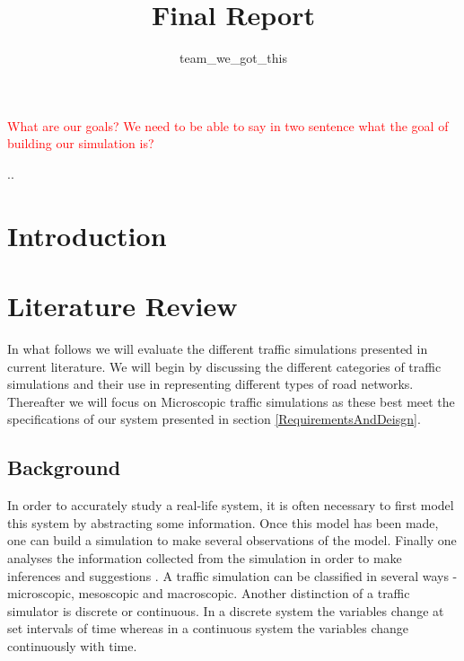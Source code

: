 \documentclass{article}
\begin{document}
\title{Final Report}
\author{team\_we\_got\_this}
\maketitle
\thispagestyle{plain}
\graphicspath{ {Images/} }

\tableofcontents
\listoffigures
\listoftables
\vspace{2cm}
\textcolor{red}{What are our goals? We need to be able to say in two sentence what the goal of building our simulation is? }

\pagebreak
..\section*{Introduction}

\section{Literature Review}
	
	\noindent
	In what follows we will evaluate the different traffic simulations presented in current literature. We will begin by discussing the different categories of traffic simulations and their use in representing different types of road networks. Thereafter we will focus on Microscopic traffic simulations as these best meet the specifications of our system presented in section \ref{RequirementsAndDeisgn}.
	
	\subsection{Background}
	
	In order to accurately study a real-life system, it is often necessary to first model this system by abstracting some information. Once this model has been made, one can build a simulation to make several observations of the model. Finally one analyses the information collected from the simulation in order to make inferences and suggestions \cite{sokolowski2011principles}. A traffic simulation can be classified in several ways - microscopic, mesoscopic and macroscopic. Another distinction of a traffic simulator is discrete or continuous. In a discrete system the variables change at set intervals of time whereas in a continuous system the variables change continuously with time. 
	
\end{document}
